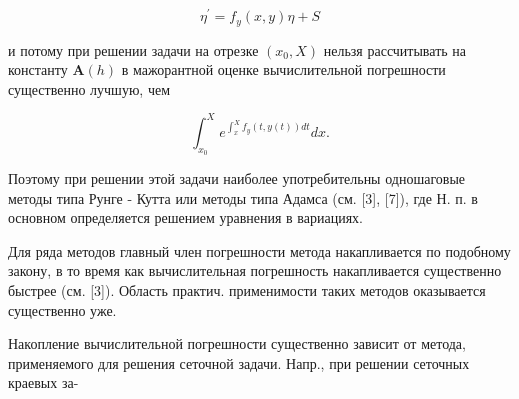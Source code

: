 \documentclass[10pt]{article}
\begin{document}
\[

\eta^{\prime}=f_{y}(x, y) \eta+S

\]



и потому при решении задачи на отрезке $\left(x_{0}, X\right)$ нельзя рассчитывать на константу $\boldsymbol{A}(h)$ в мажорантной оценке вычислительной погрешности существенно лучшую, чем



\[

\int_{x_{0}}^{X} e^{\int_{x}^{X} f_{y}(t, y(t)) d t} d x .

\]



Поэтому при решении этой задачи наиболее употребительны одношаговые методы типа Рунге - Кутта или методы типа Адамса (см. [3], [7]), где Н. п. в основном определяется решением уравнения в вариациях.



Для ряда методов главный член погрешности метода накапливается по подобному закону, в то время как вычислительная погрешность накапливается существенно быстрее (см. [3]). Область практич. применимости таких методов оказывается существенно уже.



Накопление вычислительной погрешности существенно зависит от метода, применяемого для решения сеточной задачи. Напр., при решении сеточных краевых за-
\end{document}
